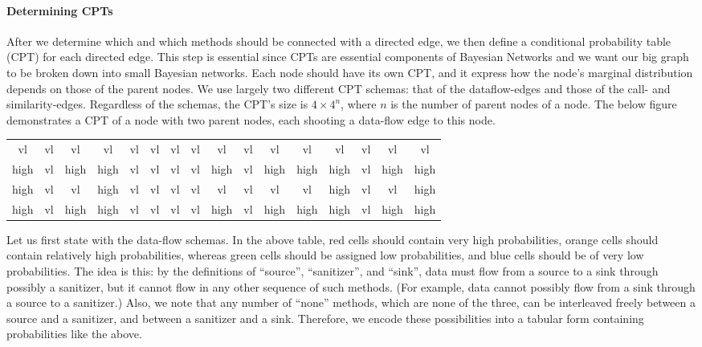 \paragraph{Determining CPTs}

After we determine which and which methods should be connected with a directed
edge, we then define a conditional probability table (CPT) for each directed
edge. This step is essential since CPTs are essential components of Bayesian
Networks and we want our big graph to be broken down into small
Bayesian networks. Each node should have its own CPT, and it express how the
node's marginal distribution depends
on those of the parent nodes. We use largely two different CPT schemas:
that of the dataflow-edges and those of the call- and similarity-edges.
Regardless of the schemas, the CPT's size is $4\times 4^n$, where $n$ is the
number of parent nodes of a node. The below figure demonstrates a CPT of a node
with two parent nodes, each shooting a data-flow edge to this node.

\begin{center}
  \begin{tabular} { |c|c|c|c|c|c|c|c|c|c|c|c|c|c|c|c| }
    \hline
    vl   & vl   & vl   & vl   & vl   & vl   & vl   & vl   & vl   & vl   & vl   & vl   & vl   & vl   & vl   & vl  \\
    high & vl   & high & high & vl   & vl   & vl   & vl   & high & vl   & high & high & high & vl   & high & high\\
    high & vl   & vl   & high & vl   & vl   & vl   & vl   & vl   & vl   & vl   & vl   & high & vl   & vl   & high\\
    high & vl   & high & high & vl   & vl   & vl   & vl   & high & vl   & high & high & high & vl   & high & high\\
    \hline
  \end{tabular}
\end{center}

Let us first state with the data-flow schemas. In the above table, red cells
should contain very high probabilities, orange
cells should contain relatively high probabilities, whereas green cells should
be assigned low probabilities, and blue cells should be of very low probabilities.
The idea is this: by the definitions of ``source'', ``sanitizer'', and ``sink'',
data must flow from a source to a sink through possibly a sanitizer, but it
cannot flow in any other sequence of such methods. (For example, data cannot
possibly flow from a sink through a source to a sanitizer.) Also, we note that
any number of ``none'' methods, which are none of the three, can be interleaved
freely between a source and a sanitizer, and between a sanitizer and a sink.
Therefore, we encode these possibilities into a tabular form containing probabilities
like the above.

